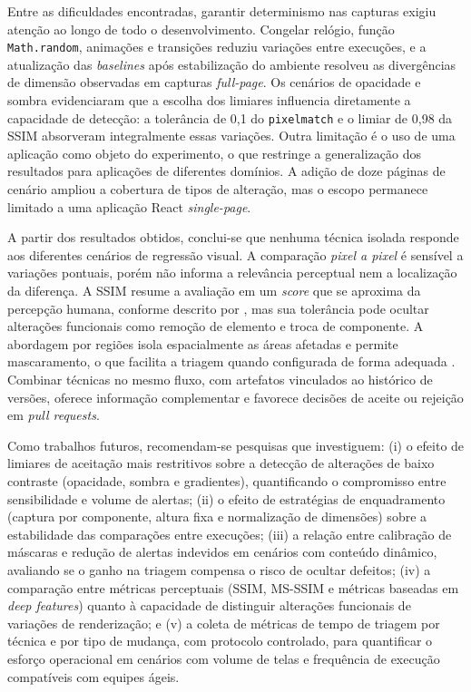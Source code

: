 \documentclass{UNESC}
\begin{document}
Entre as dificuldades encontradas, garantir determinismo nas capturas exigiu atenção ao longo de todo o desenvolvimento. Congelar relógio, função \texttt{Math.random}, animações e transições reduziu variações entre execuções, e a atualização das \emph{baselines} após estabilização do ambiente resolveu as divergências de dimensão observadas em capturas \emph{full-page}. Os cenários de opacidade e sombra evidenciaram que a escolha dos limiares influencia diretamente a capacidade de detecção: a tolerância de 0,1 do \texttt{pixelmatch} e o limiar de 0,98 da SSIM absorveram integralmente essas variações. Outra limitação é o uso de uma aplicação como objeto do experimento, o que restringe a generalização dos resultados para aplicações de diferentes domínios. A adição de doze páginas de cenário ampliou a cobertura de tipos de alteração, mas o escopo permanece limitado a uma aplicação React \emph{single-page}.

A partir dos resultados obtidos, conclui-se que nenhuma técnica isolada responde aos diferentes cenários de regressão visual. A comparação \emph{pixel a pixel} é sensível a variações pontuais, porém não informa a relevância perceptual nem a localização da diferença. A SSIM resume a avaliação em um \emph{score} que se aproxima da percepção humana, conforme descrito por , mas sua tolerância pode ocultar alterações funcionais como remoção de elemento e troca de componente. A abordagem por regiões isola espacialmente as áreas afetadas e permite mascaramento, o que facilita a triagem quando configurada de forma adequada \cite{tanno2020}. Combinar técnicas no mesmo fluxo, com artefatos vinculados ao histórico de versões, oferece informação complementar e favorece decisões de aceite ou rejeição em \emph{pull requests}.

Como trabalhos futuros, recomendam-se pesquisas que investiguem: (i) o efeito de limiares de aceitação mais restritivos sobre a detecção de alterações de baixo contraste (opacidade, sombra e gradientes), quantificando o compromisso entre sensibilidade e volume de alertas; (ii) o efeito de estratégias de enquadramento (captura por componente, altura fixa e normalização de dimensões) sobre a estabilidade das comparações entre execuções; (iii) a relação entre calibração de máscaras e redução de alertas indevidos em cenários com conteúdo dinâmico, avaliando se o ganho na triagem compensa o risco de ocultar defeitos; (iv) a comparação entre métricas perceptuais (SSIM, MS-SSIM e métricas baseadas em \emph{deep features}) quanto à capacidade de distinguir alterações funcionais de variações de renderização; e (v) a coleta de métricas de tempo de triagem por técnica e por tipo de mudança, com protocolo controlado, para quantificar o esforço operacional em cenários com volume de telas e frequência de execução compatíveis com equipes ágeis.


\renewcommand{\refname}{REFERÊNCIAS}

\end{document}
